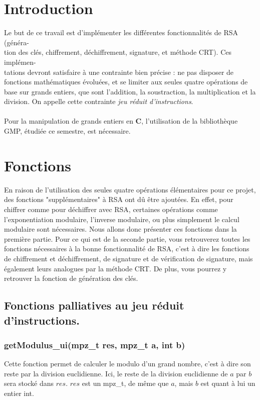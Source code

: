 \documentclass[12pt]{article}
\theoremstyle{remark}\newtheorem{note}{Note}
\theoremstyle{remark}\newtheorem{nota}{Notation}
\theoremstyle{definition}
\begin{document}

\tableofcontents
\pagebreak
\section*{Introduction}

Le but de ce travail est d'implémenter les différentes fonctionnalités de RSA (généra-\\
tion des clés, chiffrement, déchiffrement, signature, et méthode CRT). Ces implémen-\\
tations devront satisfaire à une contrainte bien précise : ne pas disposer de fonctions mathématiques évoluées, et se limiter aux seules quatre opérations de base sur grands entiers, que sont l'addition, la soustraction, la multiplication et la division. On appelle cette contrainte \textit{jeu réduit d'instructions}.\\\\
Pour la manipulation de grands entiers en \textbf{C}, l'utilisation de la bibliothèque GMP, étudiée ce semestre, est nécessaire.


\pagebreak

\section{Fonctions}
En raison de l'utilisation des seules quatre opérations élémentaires pour ce projet, des fonctions "supplémentaires" à RSA ont dû être ajoutées. En effet, pour chiffrer comme pour déchiffrer avec RSA, certaines opérations comme l'exponentiation modulaire, l'inverse modulaire, ou plus simplement le calcul modulaire sont nécessaires. Nous allons donc présenter ces fonctions dans la première partie. Pour ce qui est de la seconde partie, vous retrouverez toutes les fonctions nécessaires à la bonne fonctionnalité de RSA, c'est à dire les fonctions de chiffrement et déchiffrement, de signature et de vérification de signature, mais également leurs analogues par la méthode CRT. De plus, vous pourrez y retrouver la fonction de génération des clés.

\subsection{Fonctions palliatives au jeu réduit d'instructions.}

\subsubsection{getModulus\_ui(mpz\_t res, mpz\_t a, int b)}
Cette fonction permet de calculer le modulo d'un grand nombre, c'est à dire son reste par la division euclidienne. Ici, le reste de la division euclidienne de $a$ par $b$ sera stocké dans $res$. $res$ est un \textsf{mpz\_t}, de même que $a$, mais $b$ est quant à lui un entier \textsf{int}.
\end{document}

